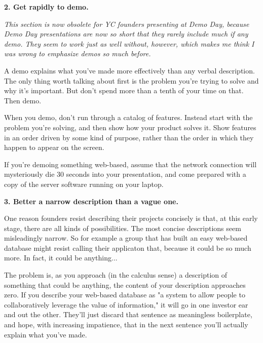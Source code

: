 \textbf{2. Get rapidly to demo.}

\emph{This section is now obsolete for YC founders presenting
                      at Demo Day, because Demo Day presentations are now so
                      short that they rarely include much if any demo. They seem
                      to work just as well without, however, which makes me
                      think I was wrong to emphasize demos so much before.}

A demo explains what you've made more
                    effectively than any verbal description. The only thing
                    worth talking about first is the problem you're trying to
                    solve and why it's important. But don't spend more than a
                    tenth of your time on that. Then demo.

When you
                    demo, don't run through a catalog of features. Instead start
                    with the problem you're solving, and then show how your
                    product solves it. Show features in an order driven by some
                    kind of purpose, rather than the order in which they happen
                    to appear on the screen.

If you're demoing
                    something web-based, assume that the network connection will
                    mysteriously die 30 seconds into your presentation, and come
                    prepared with a copy of the server software running on your
                    laptop.

\textbf{3. Better a narrow description than a vague one.}

One reason founders resist describing their
                    projects concisely is that, at this early stage, there are
                    all kinds of possibilities. The most concise descriptions
                    seem misleadingly narrow. So for example a group that has
                    built an easy web-based database might resist calling their
                    applicaton that, because it could be so much more. In fact,
                    it could be anything...

The problem is, as you
                    approach (in the calculus sense) a description of something
                    that could be anything, the content of your description
                    approaches zero. If you describe your web-based database as
                    "a system to allow people to collaboratively leverage the
                    value of information," it will go in one investor ear and
                    out the other. They'll just discard that sentence as
                    meaningless boilerplate, and hope, with increasing
                    impatience, that in the next sentence you'll actually
                    explain what you've made.

